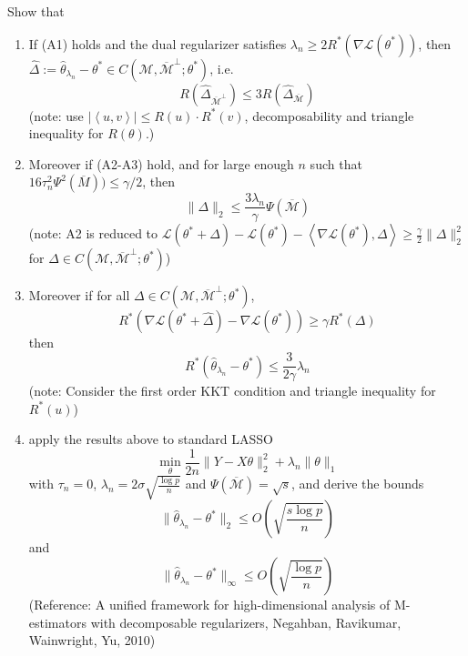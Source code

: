 \documentclass[11pt]{article}
\def\L{{\mathcal L}}
\def\M{{\mathcal M}}
\def\R{{\mathbb R}}
\begin{document}
\begin{enumerate}
Show that
\begin{enumerate}
\item If (A1) holds and the dual regularizer satisfies $\lambda_n \geq 2 R^\ast(\nabla \L(\theta^\ast))$, then $\hat{\Delta} := \hat{\theta}_{\lambda_n} - \theta^\ast \in C(\M,\overline{\M}^\perp;\theta^\ast)$, i.e.
\[  R(\hat{\Delta}_{\overline{\M}^\perp}) \leq 3 R(\hat{\Delta}_{\overline{\M}}) \]
(note: use $|\left< u, v\right>| \leq R(u) \cdot R^\ast(v)$, decomposability and triangle inequality for $R(\theta)$.)
\item Moreover if (A2-A3) hold, and for large enough $n$ such that $16 \tau_n^2 \Psi^2(\overline{M})) \leq \gamma /2$, then
\[ \|\Delta \|_2 \leq \frac{3\lambda_n}{\gamma} \Psi(\overline{\M}) \]
(note: A2 is reduced to $ \L(\theta^\ast + \Delta) - \L(\theta^\ast) - \left< \nabla \L(\theta^\ast), \Delta \right> \geq \frac{\gamma}{2}\|\Delta\|_2^2$ for $\Delta\in  C(\M,\overline{\M}^\perp;\theta^\ast)$)
\item Moreover if for all $\Delta\in  C(\M,\overline{\M}^\perp;\theta^\ast)$,
\[ R^\ast (\nabla \L(\theta^\ast + \hat{\Delta}) - \nabla \L(\theta^\ast)) \geq \gamma R^\ast(\Delta) \]
then
\[ R^\ast(\hat{\theta}_{\lambda_n} - \theta^\ast) \leq \frac{3}{2\gamma} \lambda_n \]
(note: Consider the first order KKT condition and triangle inequality for $R^\ast(u)$)
\item apply the results above to standard LASSO
\[ \min_\theta \frac{1}{2 n} \| Y - X\theta\|_2^2 + \lambda_n \|\theta\|_1 \]
with $\tau_n = 0$, $\lambda_n = 2\sigma \sqrt{\frac{\log p}{n}}$ and $\Psi(\overline{\M}) = \sqrt{s}$, and derive the bounds
\[ \|\hat{\theta}_{\lambda_n} - \theta^\ast\|_2 \leq O( \sqrt{\frac{s\log p}{n}} ) \]
and
\[ \|\hat{\theta}_{\lambda_n} - \theta^\ast\|_\infty \leq O ( \sqrt{\frac{\log p}{n}}) \]
(Reference: A unified framework for high-dimensional analysis of M-estimators with decomposable regularizers, Negahban, Ravikumar, Wainwright, Yu, 2010)
\end{enumerate}



\end{enumerate}
\end{document}
